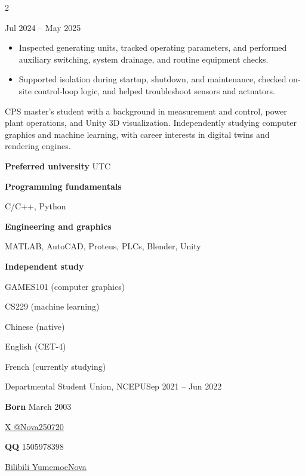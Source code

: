 \documentclass[10pt,a4paper,withhyper,normalphoto]{altacv}
\begin{document}
\begin{paracol}{2}

  {Jul 2024 -- May 2025}{}
\begin{itemize}
  \item Inspected generating units, tracked operating parameters, and performed
    auxiliary switching, system drainage, and routine equipment checks.
  \item Supported isolation during startup, shutdown, and maintenance, checked on-site
    control-loop logic, and helped troubleshoot sensors and actuators.
\end{itemize}

\switchcolumn


CPS master's student with a background in measurement and control, power plant
operations, and Unity 3D visualization. Independently studying computer graphics and
machine learning, with career interests in digital twins and rendering engines.

\smallskip
\textbf{Preferred university} UTC


\textbf{Programming fundamentals}\par
C/C++, Python

\smallskip
\textbf{Engineering and graphics}\par
MATLAB, AutoCAD, Proteus, PLCs, Blender, Unity

\smallskip
\textbf{Independent study}\par
GAMES101 (computer graphics)\par
CS229 (machine learning)


Chinese (native)\par
English (CET-4)\par
French (currently studying)



\divider

  {Departmental Student Union, NCEPU}{Sep 2021 -- Jun 2022}{}


\textbf{Born} March 2003\par
\href{https://x.com/Nova250720}{X @Nova250720}\par
\textbf{QQ} 1505978398\par
\href{https://space.bilibili.com/172457711}{Bilibili YumemoeNova}

\end{paracol}
\end{document}
